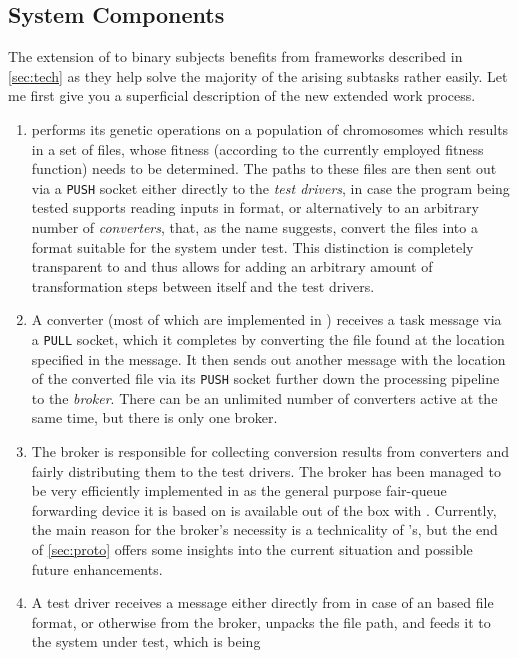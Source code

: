 \subsection{System Components}
\label{sec:components}
The extension of \xmlmate to binary subjects benefits from frameworks described in \cref{sec:tech} as they 
help solve the majority of the arising subtasks rather easily. Let me first give you a superficial description
of the new extended \xmlmate work process. 
\begin{enumerate}
  \item \xmlmate performs its genetic operations on a population of chromosomes which results in a set of 
  \xml files, whose fitness (according to the currently employed fitness function) needs to be determined.
  The paths to these files are then sent out via a \zmq \texttt{PUSH} socket either directly to the 
  \emph{test drivers}, in case the program being tested supports reading inputs in \xml format, or alternatively 
  to an arbitrary number of \emph{converters}, that, as the name suggests, convert the \xml files into a format 
  suitable for the system under test. This distinction is completely transparent to \xmlmate and thus allows for 
  adding an arbitrary amount of transformation steps between itself and the test drivers.
  \item A converter (most of which are implemented in \python) receives a task message via a 
  \zmq \texttt{PULL} socket, which it completes by converting the file found at the location specified in the message. 
  It then sends out another message with the location of the converted file via its \texttt{PUSH} socket further 
  down the processing pipeline to the \emph{broker}.
  There can be an unlimited number of converters active at the same time, but there is only one broker.
  \item The broker is responsible for collecting conversion results from converters and fairly distributing
  them to the test drivers. The broker has been managed to be very efficiently implemented in \python as the
  general purpose fair-queue forwarding device it is based on is available out of the box with \zmq.
  Currently, the main reason for the broker's necessity is a technicality of \zmq's, but the
  end of \cref{sec:proto} offers some insights into the current situation and possible future enhancements.
  \item A test driver receives a message either directly from \xmlmate in case of an \xml based file format, 
  or otherwise from the broker, unpacks the file path, and feeds it to the system under test, which is being 

\end{enumerate}
